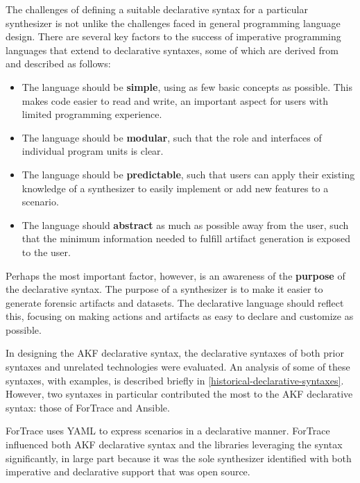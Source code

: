 \documentclass[letterpaper,12pt]{report}
\def\tightlist{}
\begin{document}
The challenges of defining a suitable declarative syntax for a
particular synthesizer is not unlike the challenges faced in general
programming language design. There are several key factors to the
success of imperative programming languages that extend to declarative
syntaxes, some of which are derived from \cite{finkel1996advanced}
and described as follows:

\begin{itemize}
\tightlist
\item
  The language should be \textbf{simple}, using as few basic concepts as
  possible. This makes code easier to read and write, an important
  aspect for users with limited programming experience.\\
\item
  The language should be \textbf{modular}, such that the role and
  interfaces of individual program units is clear.
\item
  The language should be \textbf{predictable}, such that users can apply
  their existing knowledge of a synthesizer to easily implement or add
  new features to a scenario.\\
\item
  The language should \textbf{abstract} as much as possible away from
  the user, such that the minimum information needed to fulfill artifact
  generation is exposed to the user.
\end{itemize}

Perhaps the most important factor, however, is an awareness of the
\textbf{purpose} of the declarative syntax. The purpose of a synthesizer
is to make it easier to generate forensic artifacts and datasets. The
declarative language should reflect this, focusing on making actions and
artifacts as easy to declare and customize as possible.

In designing the AKF declarative syntax, the declarative syntaxes of
both prior syntaxes and unrelated technologies were evaluated. An
analysis of some of these syntaxes, with examples, is described briefly
in \autoref{historical-declarative-syntaxes}.
However, two syntaxes in particular contributed the most to the AKF
declarative syntax: those of ForTrace and Ansible.

ForTrace uses YAML to express scenarios in a declarative manner.
ForTrace influenced both AKF declarative syntax and the libraries
leveraging the syntax significantly, in large part because it was the
sole synthesizer identified with both imperative and declarative support
that was open source.
\end{document}
